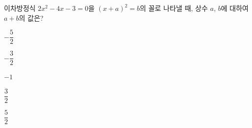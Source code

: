 이차방정식 $2x^2-4x-3=0$을 $(x+a)^2=b$의 꼴로 나타낼 때, 상수 $a$, $b$에 대하여 $a+b$의 값은?
\begin{choices32}{\rule[-3ex]{0pt}{8ex}$-\dfrac{5}{2}$}{\rule[-3ex]{0pt}{8ex}$-\dfrac{3}{2}$}{\rule[-3ex]{0pt}{8ex}$-1$}{\rule[-3ex]{0pt}{8ex}$\dfrac{3}{2}$}{\rule[-3ex]{0pt}{8ex}$\dfrac{5}{2}$}\end{choices32}
